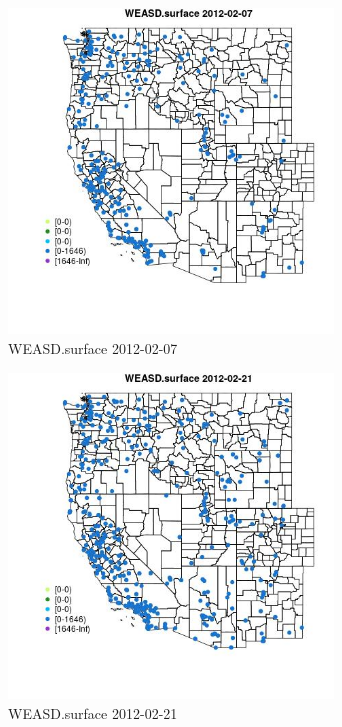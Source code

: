 \begin{figure} 
\centering  
\includegraphics[width=0.77\textwidth]{Code_Outputs/Report_ML_input_PM25_Step4_part_f_de_duplicated_aveswNAs_MapObsWEASDsurface2012-02-07.jpg} 
\caption{\label{fig:Report_ML_input_PM25_Step4_part_f_de_duplicated_aveswNAsMapObsWEASDsurface2012-02-07}WEASD.surface 2012-02-07} 
\end{figure} 
 

\begin{figure} 
\centering  
\includegraphics[width=0.77\textwidth]{Code_Outputs/Report_ML_input_PM25_Step4_part_f_de_duplicated_aveswNAs_MapObsWEASDsurface2012-02-21.jpg} 
\caption{\label{fig:Report_ML_input_PM25_Step4_part_f_de_duplicated_aveswNAsMapObsWEASDsurface2012-02-21}WEASD.surface 2012-02-21} 
\end{figure} 
 


